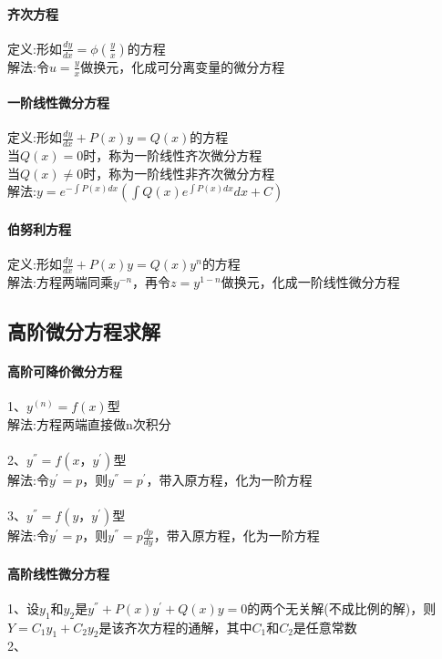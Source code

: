 \documentclass{article}
\begin{document}
\begin{flushleft}
	 \paragraph{齐次方程}
	 定义:形如$\frac{dy}{dx}=\phi(\frac{y}{x})$的方程\\
	 解法:令$u=\frac{y}{x}$做换元，化成可分离变量的微分方程\\
	 
	 \paragraph{一阶线性微分方程}
	 定义:形如$\frac{dy}{dx}+P(x)y=Q(x)$的方程\\
	 当$Q(x)=0$时，称为一阶线性齐次微分方程\\
	 当$Q(x)\neq 0$时，称为一阶线性非齐次微分方程\\
	 解法:$y=e^{-\int P(x)dx}(\int Q(x)e^{\int P(x)dx}dx+C)$\\
	 
	 \paragraph{伯努利方程}
	 定义:形如$\frac{dy}{dx}+P(x)y=Q(x)y^n$的方程\\
	 解法:方程两端同乘$y^{-n}$，再令$z=y^{1-n}$做换元，化成一阶线性微分方程\\
	 
	 \subsection{高阶微分方程求解}
	 
	 \paragraph{高阶可降价微分方程}
	 1、$y^{(n)}=f(x)$型\\
	 解法:方程两端直接做n次积分\\
	 ~\\
	 2、$y^{''}=f(x，y^{'})$型\\
	 解法:令$y^{'}=p$，则$y^{''}=p^{'}$，带入原方程，化为一阶方程\\
	 ~\\
	 3、$y^{''}=f(y，y^{'})$型\\
	 解法:令$y^{'}=p$，则$y^{''}=p\frac{dp}{dy}$，带入原方程，化为一阶方程\\

	 \paragraph{高阶线性微分方程}
	 1、设$y_1$和$y_2$是$y^{''}+P(x)y^{'}+Q(x)y=0$的两个无关解(不成比例的解)，则$Y=C_1y_1+C_2y_2$是该齐次方程的通解，其中$C_1$和$C_2$是任意常数\\
	 2、
\end{flushleft}
\end{document}

